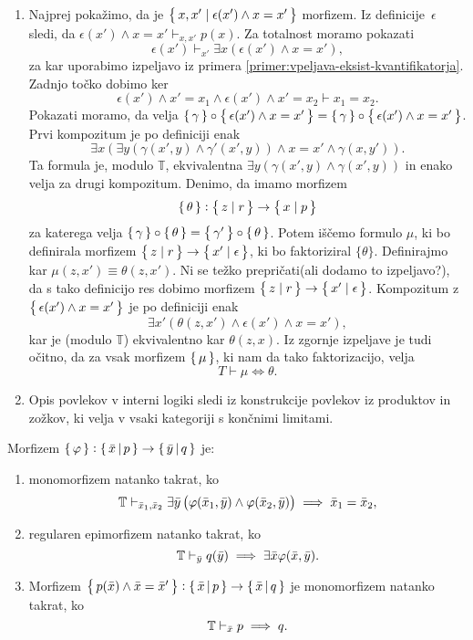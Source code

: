 \documentclass[../kategoricna_logika.tex]{subfiles}
\begin{document}
\begin{dokaz}
\begin{enumerate}[label=(\roman*)]
  \item Najprej pokažimo, da je
    $\left\lbrace\,x,x' \mid \epsilon(x') \land x = x'\,\right\rbrace$ morfizem.  Iz
    definicije~$\epsilon$ sledi, da
    $\epsilon(x') \land x = x' \vdash_{x,x'} p(x)$.  Za totalnost
    moramo pokazati
    \[ \epsilon(x') \vdash_{x'} \exists x (\epsilon(x') \land x=x'),\]
    za kar uporabimo izpeljavo iz primera
    \ref{primer:vpeljava-eksist-kvantifikatorja}.  Zadnjo točko dobimo
    ker
    \[\epsilon(x') \land x'=x_1 \land \epsilon(x') \land x'= x_2
      \vdash x_1 = x_2.\] Pokazati moramo, da velja
    $\left\lbrace\,\gamma\,\right\rbrace \circ \left\lbrace\,\epsilon(x') \land x = x'\,\right\rbrace = \left\lbrace\,\gamma\,\right\rbrace
    \circ \left\lbrace\,\epsilon(x') \land x = x'\,\right\rbrace$.  Prvi kompozitum je po
    definiciji enak
    \[\exists x( \exists y(\gamma(x',y) \land \gamma'(x',y)) \land x =
      x' \land \gamma(x,y')). \] Ta formula je, modulo $\mathbb{T}$,
    ekvivalentna $\exists y(\gamma(x',y) \land \gamma(x',y))$ in enako
    velja za drugi kompozitum.  Denimo, da imamo morfizem
    \[\left\lbrace\,\theta\,\right\rbrace : \left\lbrace\,z \mid r\,\right\rbrace \to \left\lbrace\,x \mid p\,\right\rbrace\]
    za katerega velja
    $\left\lbrace\,\gamma\,\right\rbrace \circ \left\lbrace\,\theta\,\right\rbrace = \left\lbrace\,\gamma'\,\right\rbrace \circ
    \left\lbrace\,\theta\,\right\rbrace$.  Potem iščemo formulo $\mu$, ki bo definirala
    morfizem $\left\lbrace\,z \mid r\,\right\rbrace \to \left\lbrace\,x' \mid \epsilon\,\right\rbrace$, ki bo
    faktoriziral $\{ \theta\}$.  Definirajmo kar
    $\mu(z,x') \equiv \theta(z,x')$. Ni se težko prepričati(ali dodamo
    to izpeljavo?), da s tako definicijo res dobimo morfizem
    $\left\lbrace\,z \mid r\,\right\rbrace \to \left\lbrace\,x' \mid \epsilon\,\right\rbrace$.  Kompozitum z
    $\left\lbrace\,\epsilon(x') \land x = x'\,\right\rbrace$ je po definiciji enak
    \[ \exists x' (\theta(z,x') \land \epsilon(x') \land x=x'),\] kar
    je (modulo $\mathbb{T}$) ekvivalentno kar $\theta(z,x)$.  Iz
    zgornje izpeljave je tudi očitno, da za vsak morfizem $\left\lbrace\,\mu\,\right\rbrace$,
    ki nam da tako faktorizacijo, velja
    \[T \vdash \mu \iff \theta.\]

  \item Opis povlekov v interni logiki sledi iz konstrukcije povlekov
    iz produktov in zožkov, ki velja v vsaki kategoriji s končnimi
    limitami.
  \end{enumerate}
\end{dokaz}
\begin{lema}\label{lema:morfizmi-v-sintakticni-kategoriji}
  Morfizem
  $\left\lbrace\,\varphi\,\right\rbrace : \left\lbrace\,\bar{x}\,\middle|\, p\,\right\rbrace \to
  \left\lbrace\,\bar{y}\,\middle|\, q\,\right\rbrace$ je:
  \begin{enumerate}[label=(\roman*)]
  \item monomorfizem natanko takrat, ko
      $$\mathbb{T} \vdash_{\bar{x}_1,\bar{x}_2}  \exists \bar{y} \left( \varphi(\bar{x}_1,\bar{y}) \wedge \varphi(\bar{x}_2,\bar{y}) \right) \implies \bar{x}_1 = \bar{x}_2 ,$$
    \item regularen epimorfizem natanko takrat, ko
      $$\mathbb{T} \vdash_{\bar{y}} q(\bar{y}) \implies \exists \bar{x} \varphi(\bar{x},\bar{y}).$$
    \item Morfizem
      $\left\lbrace\,p(\bar{x}) \wedge \bar{x} = \bar{x}'\,\right\rbrace :
      \left\lbrace\,\bar{x}\,\middle|\, p \,\right\rbrace \to \left\lbrace\,\bar{x}\,\middle|\, q\,\right\rbrace$ je
      monomorfizem natanko takrat, ko
      $$\mathbb{T} \vdash_{\bar{x}} p \implies q.$$
    \end{enumerate}
  \end{lema}
\end{document}
